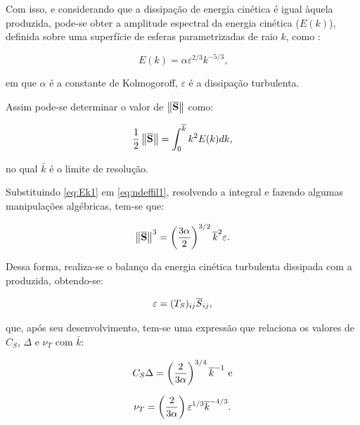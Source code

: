 Com isso, e considerando que a dissipação de energia cinética é igual àquela produzida, pode-se obter a amplitude espectral da energia cinética ($E(k)$), definida sobre uma superfície de esferas parametrizadas de raio $k$, como \cite{hughes2000large}:

\begin{equation}
    E(k)=\alpha\varepsilon^{2/3}k^{-5/3}\text{,}\label{eq:Ek1}
\end{equation}

\noindent em que $\alpha$ é a constante de Kolmogoroff, $\varepsilon$ é a dissipação turbulenta.

Assim pode-se determinar o valor de $\left\lVert{\overline{\mathbf{S}}}\right\lVert$ como:

\begin{equation}
    \frac{1}{2}\left\lVert{\overline{\mathbf{S}}}\right\lVert=\int_0^{\overline{k}}{k^2E(k)dk}\text{,}\label{eq:ndeffil1}
\end{equation}

\noindent no qual $\bar{k}$ é o limite de resolução.

Substituindo \ref{eq:Ek1} em \ref{eq:ndeffil1}, resolvendo a integral e fazendo algumas manipulações algébricas, tem-se que:

\begin{equation}
    \left\lVert{\overline{\mathbf{S}}}\right\lVert^3=\left({\frac{3\alpha}{2}}\right)^{3/2}\overline{k}^2\varepsilon\text{.}
\end{equation}

Dessa forma, realiza-se o balanço da energia cinética turbulenta dissipada com a produzida, obtendo-se:

\begin{equation}
    \varepsilon=({T}_S)_{ij}\overline{S}_{ij}\text{,}
\end{equation}

\noindent que, após seu desenvolvimento, tem-se uma expressão que relaciona os valores de $C_S$, $\Delta$ e $\nu_T$ com $\bar{k}$:

\begin{equation}
    C_S\Delta=\left({\frac{2}{3\alpha}}\right)^{3/4}\overline{k}^{-1}\text{ e}
\end{equation}

\begin{equation}
    \nu_T=\left({\frac{2}{3\alpha}}\right)\varepsilon^{1/3}\overline{k}^{-4/3}\text{.}
\end{equation}